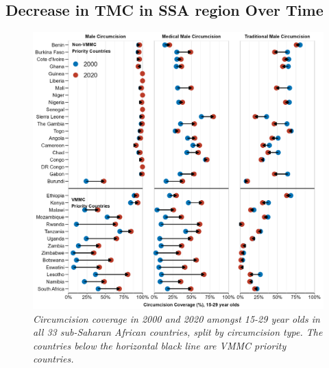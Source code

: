 \documentclass{article}
\begin{document}
\subsection{Decrease in TMC in SSA region Over Time}
\label{sec:org5fb5e18}

\begin{figure}[H]
    \centering
    \includegraphics[width=1\linewidth]
    {plots/06_change_00_20.png}
    \caption{\emph{Circumcision coverage in 2000 and 2020 amongst 15-29 year olds in all 33 sub-Saharan African countries, split by circumcision type. The countries below the horizontal black line are VMMC priority countries.}}
\end{figure}
\end{document}
